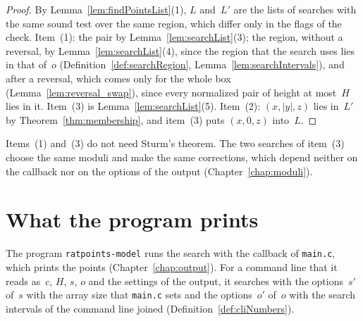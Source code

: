 \begin{proof}
  \leanok
  By Lemma~\ref{lem:findPointsList}(1), $L$ and~$L'$ are the lists of searches with the same sound
  test over the same region, which differ only in the flags of the check. Item~(1): the pair by
  Lemma~\ref{lem:searchList}(3); the region, without a reversal, by Lemma~\ref{lem:searchList}(4),
  since the region that the search uses lies in that of~$o$ (Definition~\ref{def:searchRegion},
  Lemma~\ref{lem:searchIntervals}), and after a reversal, which comes only for the whole box
  (Lemma~\ref{lem:reversal_swap}), since every normalized pair of height at most~$H$ lies in it.
  Item~(3) is Lemma~\ref{lem:searchList}(5). Item~(2): $(x, |y|, z)$ lies in~$L'$ by
  Theorem~\ref{thm:membership}, and item~(3) puts $(x, 0, z)$ into~$L$.
\end{proof}

Items~(1) and~(3) do not need Sturm's theorem. The two searches of item~(3) choose the same moduli
and make the same corrections, which depend neither on the callback nor on the options of the output
(Chapter~\ref{chap:moduli}).

\section{What the program prints}\label{sec:theoremsProgram}

The program \verb|ratpoints-model| runs the search with the callback of \verb|main.c|, which prints
the points (Chapter~\ref{chap:output}). For a command line that it reads as~$c$, $H$, $s$, $o$ and
the settings of the output, it searches with the options~$s'$ of~$s$ with the array size that
\verb|main.c| sets and the options~$o'$ of~$o$ with the search intervals of the command line joined
(Definition~\ref{def:cliNumbers}).

